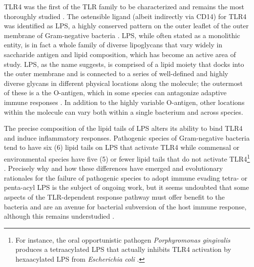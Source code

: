 TLR4 was the first of the TLR family to be characterized and remains the most thoroughly studied \citep{Lu2008}. The ostensible ligand (albeit indirectly via CD14) for TLR4 was identified as LPS, a highly conserved pattern on the outer leaflet of the outer membrane of Gram\hyp{}negative bacteria \citep{Wright1990, Guha2001, Shi2014, Kayagaki2013}. LPS, while often stated as a monolithic entity, is in fact a whole family of diverse lipoglycans that vary widely in saccharide antigen and lipid composition, which has become an active area of study. LPS, as the name suggests, is comprised of a lipid moiety that docks into the outer membrane and is connected to a series of well\hyp{}defined and highly diverse glycans in different physical locations along the molecule; the outermost of these is a the O\hyp{}antigen, which in some species can antagonize adaptive immune responses \citep{DominguezMedina2020}. In addition to the highly variable O\hyp{}antigen, other locations within the molecule can vary both within a single bacterium and across species.

The precise composition of the lipid tails of LPS alters its ability to bind  TLR4 and induce inflammatory responses. Pathogenic species of Gram\hyp{}negative bacteria tend to have six (6) lipid tails on LPS that activate TLR4 while commensal or environmental species have five (5) or fewer lipid tails that do not activate TLR4\footnote{For instance, the oral opportunistic pathogen \textit{Porphyromonas gingivalis} produces a tetraacylated LPS that actually inhibits TLR4 activation by hexaacylated LPS from \textit{Escherichia coli} \citep{Zhang2008a, Darveau2004, Herath2013}.} \citep{Dixon2005, Ueda2010, Steimle2016, Gyorfy2013, Tan2015, Simpson2019, Lebeer2010}. Precisely why and how these differences have emerged and evolutionary rationales for the failure of pathogenic species to adopt immune evading tetra\hyp{} or penta\hyp{}acyl LPS is the subject of ongoing work, but it seems undoubted that some aspects of the TLR\hyp{}dependent response pathway must offer benefit to the bacteria and are an avenue for bacterial subversion of the host immune response, although this remains understudied \citep{Park2013, McGuire2015}.

